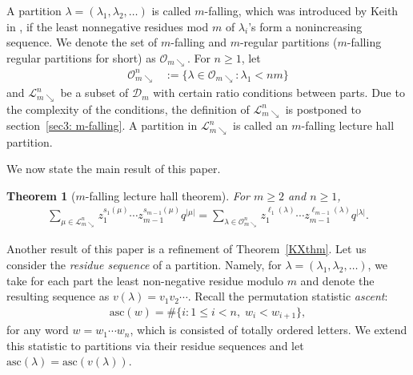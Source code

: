 \documentclass[11pt,reqno]{amsart}
\numberwithin{equation}{section}
\theoremstyle{plain}
\newtheorem{theorem}{Theorem}[section]
\theoremstyle{definition}
\newcommand{\D}{\mathcal{D}}
\newcommand{\OO}{\mathcal{O}}
\newcommand{\LL}{\mathcal{L}}
\def\asc{\mathrm{asc}}
\newcommand\qbin[2]{{\left[\begin{matrix} #1 \\ #2 \end{matrix} \right]}}
\begin{document}
A partition $\lambda=(\lambda_1,\lambda_2,\ldots)$ is called $m$-falling, which was introduced by Keith in \cite{Kei-the}, if the least nonnegative residues mod $m$ of $\lambda_i$'s form a nonincreasing sequence.  We denote the set of $m$-falling and $m$-regular partitions ($m$-falling regular partitions for short) as $\OO_{m\searrow}$.
For $n\ge 1$, let
\begin{align*}
\OO_{m\searrow}^n&:=\{\lambda\in\OO_{m\searrow}:\lambda_1<nm\}
\end{align*}
and $\LL_{m\searrow}^n$ be a subset of $\D_m$ with certain ratio conditions between parts. Due to the complexity of the conditions, the definition of $\LL_{m\searrow}^n$ is postponed to section~\ref{sec3: m-falling}.  A partition in $\LL_{m\searrow}^n$ is called an $m$-falling lecture hall partition.

We now state the main result of this paper.

\begin{theorem}[$m$-falling lecture hall theorem]\label{thm:mfallingLH}
For $m\ge 2$ and $n\ge 1$,
\begin{align}
\sum_{\mu \in \LL_{m\searrow}^n}z_1^{s_1(\mu)}\cdots z_{m-1}^{s_{m-1}(\mu)}q^{|\mu|}=\sum_{\lambda \in \OO_{m\searrow}^n} z_1^{\ell_1(\lambda)}\cdots z_{m-1}^{\ell_{m-1}(\lambda)}q^{|\lambda|}.
\end{align}
\end{theorem}





Another result of this paper is a refinement of Theorem~\ref{KXthm}. Let us consider the \emph{residue sequence} of a partition. Namely, for $\lambda=(\lambda_1,\lambda_2,\ldots)$, we take for each part the least non-negative residue modulo $m$ and denote the resulting sequence as $v(\lambda)=v_1v_2\cdots$. Recall the permutation statistic \emph{ascent}:
\begin{align*}
\asc(w)=\#\{i:1\le i <n,\;w_i<w_{i+1}\},
\end{align*}
for any word $w=w_1\cdots w_n$, which is consisted of totally ordered letters. We extend this statistic to partitions via their residue sequences and let $\asc(\lambda)=\asc(v(\lambda))$. 
\end{document}
